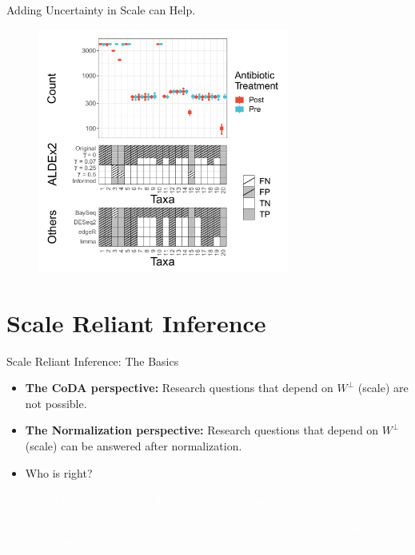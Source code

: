 \documentclass[
  ignorenonframetext,
]{beamer}
\begin{document}
\begin{frame}{Adding Uncertainty in Scale can Help.}
\protect\hypertarget{adding-uncertainty-in-scale-can-help.}{}
\begin{figure}
  \centering
  \includegraphics[width=3.25in]{figures/sim-res.pdf}
\end{figure}
\end{frame}

\hypertarget{scale-reliant-inference}{%
\section{Scale Reliant Inference}\label{scale-reliant-inference}}

\begin{frame}{Scale Reliant Inference: The Basics}
\protect\hypertarget{scale-reliant-inference-the-basics}{}
\begin{itemize}
\item
  \textbf{The CoDA perspective:} Research questions that depend on
  \(W^\perp\) (scale) are not possible.
\item
  \textbf{The Normalization perspective:} Research questions that depend
  on \(W^\perp\) (scale) can be answered after normalization.
\item
  Who is right?
\end{itemize}

\textcolor{white}{- **The CoDA perspective:** Yes, but this is limiting in practice.}

\textcolor{white}{- **The Normalization perspective:** Not correct, but attempting to answer relevant questions.}
\end{frame}
\end{document}
